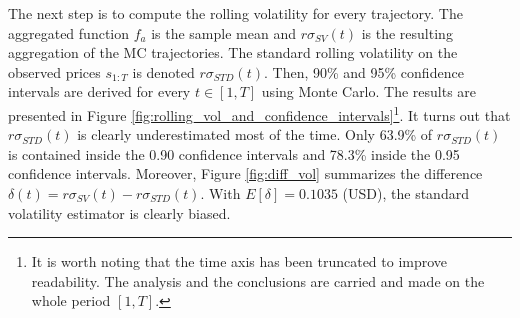 \documentclass[11pt,a4,twosided,singlespacing,titlepagenumber=on]{scrreprt}
\numberwithin{equation}{chapter} %
\theoremstyle{remark}
\begin{document}
The next step is to compute the rolling volatility for every trajectory. The aggregated function $f_a$ is the sample mean and $r\sigma_{SV}(t)$ is the resulting aggregation of the MC trajectories. The standard rolling volatility on the observed prices $s_{1:T}$ is denoted $r\sigma_{STD}(t)$. Then, 90\% and 95\% confidence intervals are derived for every $t \in [1,T]$ using Monte Carlo. The results are presented in Figure \ref{fig:rolling_vol_and_confidence_intervals}\footnote{It is worth noting that the time axis has been truncated to improve readability. The analysis and the conclusions are carried and made on the whole period $[1,T]$.}. It turns out that $r\sigma_{STD}(t)$ is clearly underestimated most of the time. Only 63.9\% of $r\sigma_{STD}(t)$ is contained inside the 0.90 confidence intervals and 78.3\% inside the 0.95 confidence intervals. Moreover, Figure \ref{fig:diff_vol} summarizes the difference $\delta(t) = r\sigma_{SV}(t) - r\sigma_{STD}(t)$. With $E[\delta] = 0.1035$ (USD), the standard volatility estimator is clearly biased.
\end{document}
